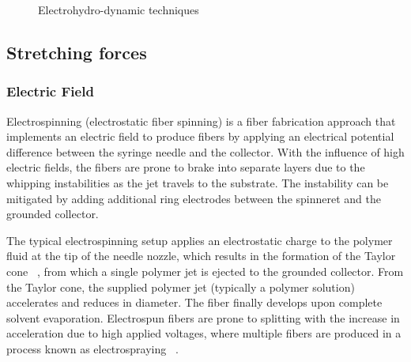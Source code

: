 \bgroup
\begin{figure}[!htbp]
\centering \makeatletter{}
\makeatother 
\caption{{Electrohydro-dynamic techniques}}
\label{f-02e0e3cf88d6}
\end{figure}
\egroup

\subsection{Stretching forces}

\subsubsection{Electric Field}Electrospinning (electrostatic fiber spinning) is a fiber fabrication approach that implements an electric field to produce fibers by applying an electrical potential difference between the syringe needle and the collector. With the influence of high electric fields, the fibers are prone to brake into separate layers due to the whipping instabilities as the jet travels to the substrate. The instability can be mitigated by adding additional ring electrodes between the spinneret and the grounded collector. \unskip~\cite{527120:13915304}

The typical electrospinning setup applies an electrostatic charge to the polymer fluid at the tip of the needle nozzle, which results in the formation of the Taylor cone \unskip~\cite{527120:13659828}, from which a single polymer jet is ejected to the grounded collector. From the Taylor cone, the supplied polymer jet (typically a polymer solution) accelerates and reduces in diameter. The fiber finally develops upon complete solvent evaporation. Electrospun fibers are prone to splitting with the increase in acceleration due to high applied voltages, where multiple fibers are produced in a process known as electrospraying \unskip~\cite{527120:13659925}.

